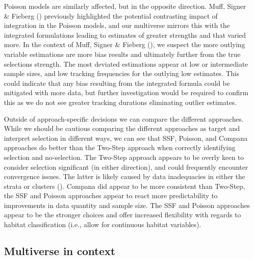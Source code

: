 \documentclass[10pt,a4paper]{article}
\begin{document}
Poisson models are similarly affected, but in the opposite direction.
Muff, Signer \& Fieberg () previously highlighted the potential contrasting impact of integration in the Poisson models, and our multiverse mirrors this with the integrated formulations leading to estimates of greater strengths and that varied more.
In the context of Muff, Signer \& Fieberg (), we suspect the more outlying variable estimations are more bias results and ultimately further from the true selections strength.
The most deviated estimations appear at low or intermediate sample sizes, and low tracking frequencies for the outlying low estimates.
This could indicate that any bias resulting from the integrated formula could be mitigated with more data, but further investigation would be required to confirm this as we do not see greater tracking durations eliminating outlier estimates.

Outside of approach-specific decisions we can compare the different approaches.
While we should be cautious comparing the different approaches as target and interpret selection in different ways, we can see that SSF, Poisson, and Compana approaches do better than the Two-Step approach when correctly identifying selection and no-selection.
The Two-Step approach appears to be overly keen to consider selection significant (in either direction), and could frequently encounter convergence issues.
The latter is likely caused by data inadequacies in either the strata or clusters ().
Compana did appear to be more consistent than Two-Step, the SSF and Poisson approaches appear to react more predictability to improvements in data quantity and sample size.
The SSF and Poisson approaches appear to be the stronger choices and offer increased flexibility with regards to habitat classification (i.e., allow for continuous habitat variables).

\subsection{Multiverse in context}\label{multiverse-in-context}
\end{document}
